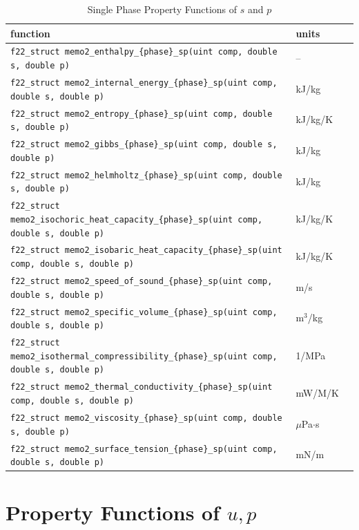 \documentclass[oneside]{book}
\begin{document}
\begin{table}[h!]
\centering
\caption{Single Phase Property Functions of $s$ and $p$}
\begin{tabular}{ l l l }
\hline
function & units \\
\hline
\hline
\texttt{f22\_struct memo2\_enthalpy\_\{phase\}\_sp(uint comp, double s, double p)} & -- \\ [1ex]
\texttt{f22\_struct memo2\_internal\_energy\_\{phase\}\_sp(uint comp, double s, double p)} &  kJ/kg \\ [1ex]
\texttt{f22\_struct memo2\_entropy\_\{phase\}\_sp(uint comp, double s, double p)} &  kJ/kg/K \\ [1ex]
\texttt{f22\_struct memo2\_gibbs\_\{phase\}\_sp(uint comp, double s, double p)} &  kJ/kg \\ [1ex]
\texttt{f22\_struct memo2\_helmholtz\_\{phase\}\_sp(uint comp, double s, double p)} &  kJ/kg \\ [1ex]
\texttt{f22\_struct memo2\_isochoric\_heat\_capacity\_\{phase\}\_sp(uint comp, double s, double p)} &  kJ/kg/K \\ [1ex]
\texttt{f22\_struct memo2\_isobaric\_heat\_capacity\_\{phase\}\_sp(uint comp, double s, double p)} &  kJ/kg/K \\ [1ex]
\texttt{f22\_struct memo2\_speed\_of\_sound\_\{phase\}\_sp(uint comp, double s, double p)} &  m/s \\ [1ex]
\texttt{f22\_struct memo2\_specific\_volume\_\{phase\}\_sp(uint comp, double s, double p)} &  m$^3$/kg \\ [1ex]
\texttt{f22\_struct memo2\_isothermal\_compressibility\_\{phase\}\_sp(uint comp, double s, double p)} &  1/MPa \\ [1ex]
\texttt{f22\_struct memo2\_thermal\_conductivity\_\{phase\}\_sp(uint comp, double s, double p)} &  mW/M/K \\ [1ex]
\texttt{f22\_struct memo2\_viscosity\_\{phase\}\_sp(uint comp, double s, double p)} &  $\mu$Pa$\cdot$s \\ [1ex]
\texttt{f22\_struct memo2\_surface\_tension\_\{phase\}\_sp(uint comp, double s, double p)} &  mN/m \\ [1ex]
 \hline    
\end{tabular}
\label{table:single_sp_props}
\end{table}

\section{Property Functions of $u, p$}
\end{document}
